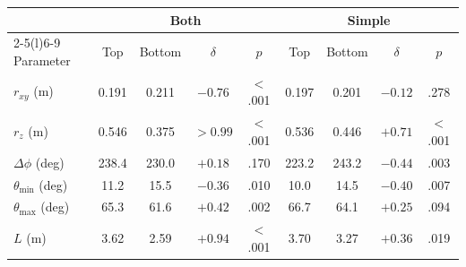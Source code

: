 \begin{tabular}{@{}lcccccccc@{}}
\toprule
 & \multicolumn{4}{c}{Both} & \multicolumn{4}{c}{Simple} \\
\cmidrule(lr){2-5}\cmidrule(l){6-9}
Parameter & Top & Bottom & $\delta$ & $p$ & Top & Bottom & $\delta$ & $p$ \\
\midrule
$r_{xy}$ (m) & 0.191 & 0.211 & $-0.76$ & $<$.001 & 0.197 & 0.201 & $-0.12$ & .278 \\
$r_z$ (m) & 0.546 & 0.375 & $>0.99$ & $<$.001 & 0.536 & 0.446 & $+0.71$ & $<$.001 \\
$\Delta\phi$ (deg) & 238.4 & 230.0 & $+0.18$ & .170 & 223.2 & 243.2 & $-0.44$ & .003 \\
$\theta_{\min}$ (deg) & 11.2 & 15.5 & $-0.36$ & .010 & 10.0 & 14.5 & $-0.40$ & .007 \\
$\theta_{\max}$ (deg) & 65.3 & 61.6 & $+0.42$ & .002 & 66.7 & 64.1 & $+0.25$ & .094 \\
$L$ (m) & 3.62 & 2.59 & $+0.94$ & $<$.001 & 3.70 & 3.27 & $+0.36$ & .019 \\
\bottomrule
\end{tabular}

